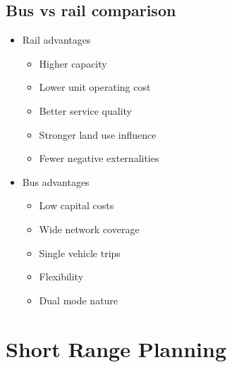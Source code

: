 \documentclass[11pt]{article}
\begin{document}
\subsection{Bus vs rail comparison}
\label{sec:org59914b3}
\begin{itemize}
\item Rail advantages
\begin{itemize}
\item Higher capacity
\item Lower unit operating cost
\item Better service quality
\item Stronger land use influence
\item Fewer negative externalities
\end{itemize}
\item Bus advantages
\begin{itemize}
\item Low capital costs
\item Wide network coverage
\item Single vehicle trips
\item Flexibility
\item Dual mode nature
\end{itemize}
\end{itemize}

\clearpage
\section{Short Range Planning}
\label{sec:org58f7995}
\end{document}

